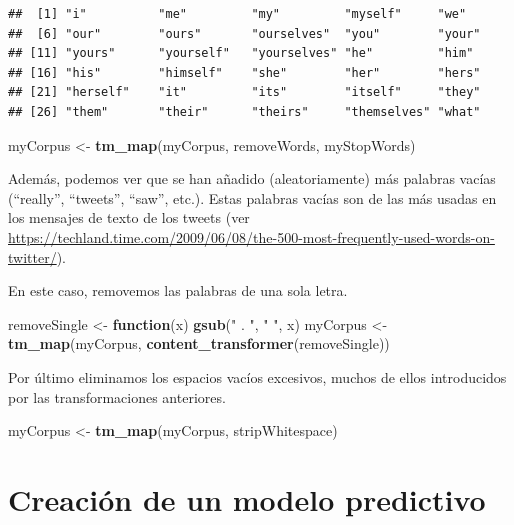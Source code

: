 \documentclass[
]{article}
\newenvironment{Shaded}{\begin{snugshade}}{\end{snugshade}}
\newcommand{\ControlFlowTok}[1]{\textcolor[rgb]{0.13,0.29,0.53}{\textbf{#1}}}
\newcommand{\KeywordTok}[1]{\textcolor[rgb]{0.13,0.29,0.53}{\textbf{#1}}}
\newcommand{\NormalTok}[1]{#1}
\newcommand{\StringTok}[1]{\textcolor[rgb]{0.31,0.60,0.02}{#1}}
\begin{document}
\begin{verbatim}
##  [1] "i"          "me"         "my"         "myself"     "we"        
##  [6] "our"        "ours"       "ourselves"  "you"        "your"      
## [11] "yours"      "yourself"   "yourselves" "he"         "him"       
## [16] "his"        "himself"    "she"        "her"        "hers"      
## [21] "herself"    "it"         "its"        "itself"     "they"      
## [26] "them"       "their"      "theirs"     "themselves" "what"
\end{verbatim}

\begin{Shaded}
\begin{Highlighting}[]
\NormalTok{myCorpus <-}\StringTok{ }\KeywordTok{tm_map}\NormalTok{(myCorpus, removeWords, myStopWords) }
\end{Highlighting}
\end{Shaded}

Además, podemos ver que se han añadido (aleatoriamente) más palabras
vacías (``really'', ``tweets'', ``saw'', etc.). Estas palabras vacías
son de las más usadas en los mensajes de texto de los tweets (ver
\url{https://techland.time.com/2009/06/08/the-500-most-frequently-used-words-on-twitter/}).

En este caso, removemos las palabras de una sola letra.

\begin{Shaded}
\begin{Highlighting}[]
\NormalTok{removeSingle <-}\StringTok{ }\ControlFlowTok{function}\NormalTok{(x) }\KeywordTok{gsub}\NormalTok{(}\StringTok{" . "}\NormalTok{, }\StringTok{" "}\NormalTok{, x)   }
\NormalTok{myCorpus <-}\StringTok{ }\KeywordTok{tm_map}\NormalTok{(myCorpus, }\KeywordTok{content_transformer}\NormalTok{(removeSingle))}
\end{Highlighting}
\end{Shaded}

Por último eliminamos los espacios vacíos excesivos, muchos de ellos
introducidos por las transformaciones anteriores.

\begin{Shaded}
\begin{Highlighting}[]
\NormalTok{myCorpus <-}\StringTok{ }\KeywordTok{tm_map}\NormalTok{(myCorpus, stripWhitespace)}
\end{Highlighting}
\end{Shaded}

\hypertarget{creaciuxf3n-de-un-modelo-predictivo}{%
\section{Creación de un modelo
predictivo}\label{creaciuxf3n-de-un-modelo-predictivo}}
\end{document}

